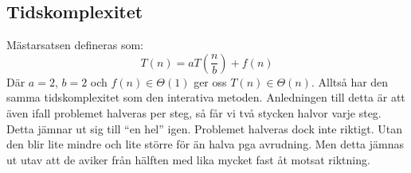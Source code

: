 \subsection{Tidskomplexitet}
Mästarsatsen defineras som:
\[
    T(n) = aT(\frac{n}{b})+f(n)
\]
Där $a = 2$, $b = 2$ och $f(n) \in \Theta(1)$ ger oss $T(n) \in \Theta(n)$.
Alltså har den samma tidskomplexitet som den interativa metoden. Anledningen till detta
är att även ifall problemet halveras per steg, så får vi två stycken halvor varje steg. Detta jämnar
ut sig till ``en hel'' igen. Problemet halveras dock inte riktigt. Utan den blir lite mindre och lite större
för än halva pga avrudning. Men detta jämnas ut utav att de aviker från hälften med lika mycket fast åt motsat
riktning.
